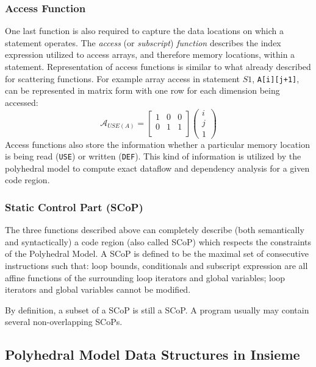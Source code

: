 \subsubsection{Access Function}
One last function is also required to capture the data locations on which a
statement operates. The \emph{access} (or \emph{subscript}) \emph{function} 
describes the index expression utilized to access arrays, and therefore memory
locations, within a statement. Representation of access functions is similar to
what already described for scattering functions. For example array 
access in statement $S1$, \texttt{A[i][j+1]}, can be represented in matrix form
with one row for each dimension being accessed:
\[
\mathcal{A}_{USE(A)} =  \begin{bmatrix} 1 & 0 & 0 \\ 0 & 1 & 1 \\ 
						\end{bmatrix} 
						\begin{pmatrix} i \\ j \\ 1 \end{pmatrix}
\]
Access functions also store the information whether a particular memory location
is being read (\texttt{USE}) or written (\texttt{DEF}). This kind of
information is utilized by the polyhedral model to compute exact dataflow and
dependency analysis for a given code region. 

\subsubsection{Static Control Part (SCoP)}

The three functions described above can completely describe (both semantically
and syntactically) a code region (also called SCoP) which respects the
constraints of the Polyhedral Model. A SCoP is defined to be the maximal set of
consecutive instructions such that: loop bounds, conditionals and subscript
expression are all affine functions of the surrounding loop iterators and global
variables; loop iterators and global variables cannot be modified. 

By definition, a subset of a SCoP is still a SCoP. A program usually may contain
several non-overlapping SCoPs. 

\subsection{Polyhedral Model Data Structures in Insieme}

